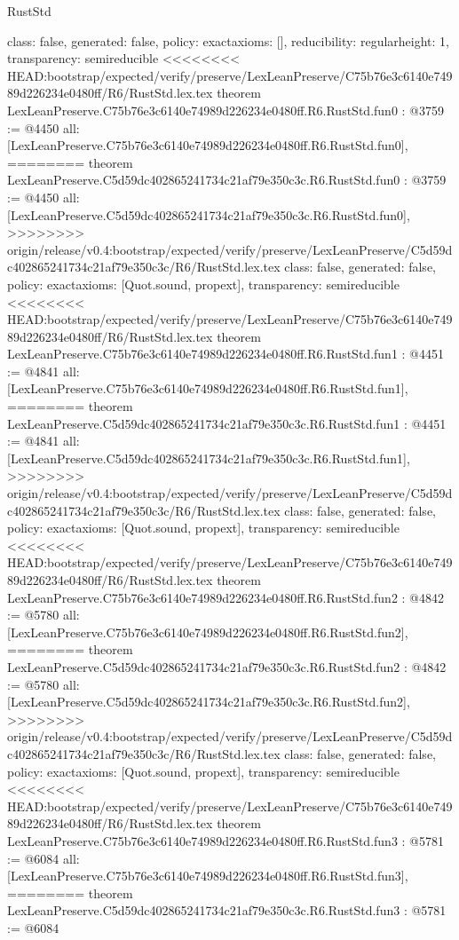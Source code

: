 \begin{lexlean}{RustStd}
\begin{coremodule}
{\begin{coremodule}
{{{  class: false,
  generated: false,
  policy: exact{axioms: []},
  reducibility: regular{height: 1},
  transparency: semireducible
}
<<<<<<<< HEAD:bootstrap/expected/verify/preserve/LexLeanPreserve/C75b76e3c6140e74989d226234e0480ff/R6/RustStd.lex.tex
theorem LexLeanPreserve.C75b76e3c6140e74989d226234e0480ff.R6.RustStd.fun0 : @3759 := @4450 {
  all: [LexLeanPreserve.C75b76e3c6140e74989d226234e0480ff.R6.RustStd.fun0],
========
theorem LexLeanPreserve.C5d59dc402865241734c21af79e350c3c.R6.RustStd.fun0 : @3759 := @4450 {
  all: [LexLeanPreserve.C5d59dc402865241734c21af79e350c3c.R6.RustStd.fun0],
>>>>>>>> origin/release/v0.4:bootstrap/expected/verify/preserve/LexLeanPreserve/C5d59dc402865241734c21af79e350c3c/R6/RustStd.lex.tex
  class: false,
  generated: false,
  policy: exact{axioms: [Quot.sound, propext]},
  transparency: semireducible
}
<<<<<<<< HEAD:bootstrap/expected/verify/preserve/LexLeanPreserve/C75b76e3c6140e74989d226234e0480ff/R6/RustStd.lex.tex
theorem LexLeanPreserve.C75b76e3c6140e74989d226234e0480ff.R6.RustStd.fun1 : @4451 := @4841 {
  all: [LexLeanPreserve.C75b76e3c6140e74989d226234e0480ff.R6.RustStd.fun1],
========
theorem LexLeanPreserve.C5d59dc402865241734c21af79e350c3c.R6.RustStd.fun1 : @4451 := @4841 {
  all: [LexLeanPreserve.C5d59dc402865241734c21af79e350c3c.R6.RustStd.fun1],
>>>>>>>> origin/release/v0.4:bootstrap/expected/verify/preserve/LexLeanPreserve/C5d59dc402865241734c21af79e350c3c/R6/RustStd.lex.tex
  class: false,
  generated: false,
  policy: exact{axioms: [Quot.sound, propext]},
  transparency: semireducible
}
<<<<<<<< HEAD:bootstrap/expected/verify/preserve/LexLeanPreserve/C75b76e3c6140e74989d226234e0480ff/R6/RustStd.lex.tex
theorem LexLeanPreserve.C75b76e3c6140e74989d226234e0480ff.R6.RustStd.fun2 : @4842 := @5780 {
  all: [LexLeanPreserve.C75b76e3c6140e74989d226234e0480ff.R6.RustStd.fun2],
========
theorem LexLeanPreserve.C5d59dc402865241734c21af79e350c3c.R6.RustStd.fun2 : @4842 := @5780 {
  all: [LexLeanPreserve.C5d59dc402865241734c21af79e350c3c.R6.RustStd.fun2],
>>>>>>>> origin/release/v0.4:bootstrap/expected/verify/preserve/LexLeanPreserve/C5d59dc402865241734c21af79e350c3c/R6/RustStd.lex.tex
  class: false,
  generated: false,
  policy: exact{axioms: [Quot.sound, propext]},
  transparency: semireducible
}
<<<<<<<< HEAD:bootstrap/expected/verify/preserve/LexLeanPreserve/C75b76e3c6140e74989d226234e0480ff/R6/RustStd.lex.tex
theorem LexLeanPreserve.C75b76e3c6140e74989d226234e0480ff.R6.RustStd.fun3 : @5781 := @6084 {
  all: [LexLeanPreserve.C75b76e3c6140e74989d226234e0480ff.R6.RustStd.fun3],
========
theorem LexLeanPreserve.C5d59dc402865241734c21af79e350c3c.R6.RustStd.fun3 : @5781 := @6084 {
}}}}}}}
\end{coremodule}}
\end{coremodule}
\end{lexlean}
